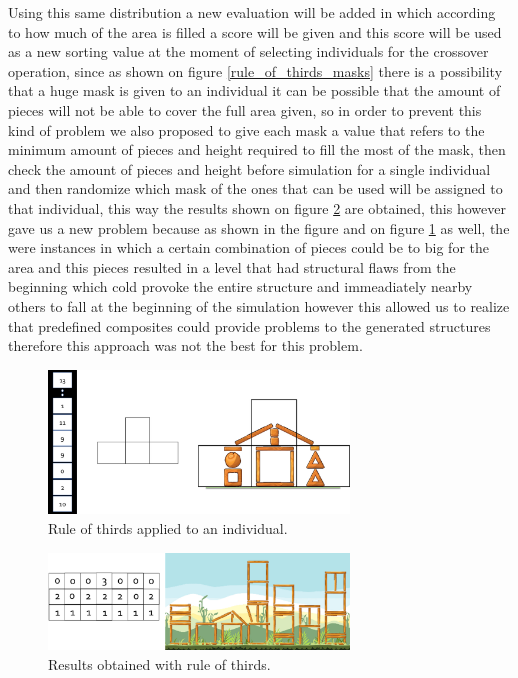 \documentclass[conference]{IEEEtran}
\begin{document}
Using this same distribution a new evaluation will be added in which according
to how much of the area is filled a score will be given and this score will be
used as a new sorting value at the moment of selecting individuals for the
crossover operation, since as shown on figure \ref{rule_of_thirds_masks} there
is a possibility that a huge mask is given to an individual it can be possible
that the amount of pieces will not be able to cover the full area given, so in
order to prevent this kind of problem we also proposed to give each mask a
value that refers to the minimum amount of pieces and height required to fill
the most of the mask, then check the amount of pieces and height before
simulation for a single individual and then randomize which mask of the ones
that can be used will be assigned to that individual, this way the results shown
on figure \ref{rule_of_thirds_result} are obtained, this however gave us a new
problem because as shown in the figure and on figure \ref{rule_of_thirds_applied} as well, the were
instances in which a certain combination of pieces could be to big for the area
and this pieces resulted in a level that had structural flaws from the beginning
which cold provoke the entire structure and immeadiately nearby others to fall
at the beginning of the simulation however this allowed us to realize that predefined 
composites could provide problems to the generated structures therefore this approach 
was not the best for this problem.

\begin{figure}[htbp]
    \centerline{\includegraphics[width=80mm]{Images/chromosome_thirds.png}}
    \caption{Rule of thirds applied to an individual.}
    \label{rule_of_thirds_applied}
\end{figure}

\begin{figure}[htbp]
    \centerline{\includegraphics[width=80mm]{Images/result_example_thirds.png}}
    \caption{Results obtained with rule of thirds.}
    \label{rule_of_thirds_result}
\end{figure}
\end{document}
